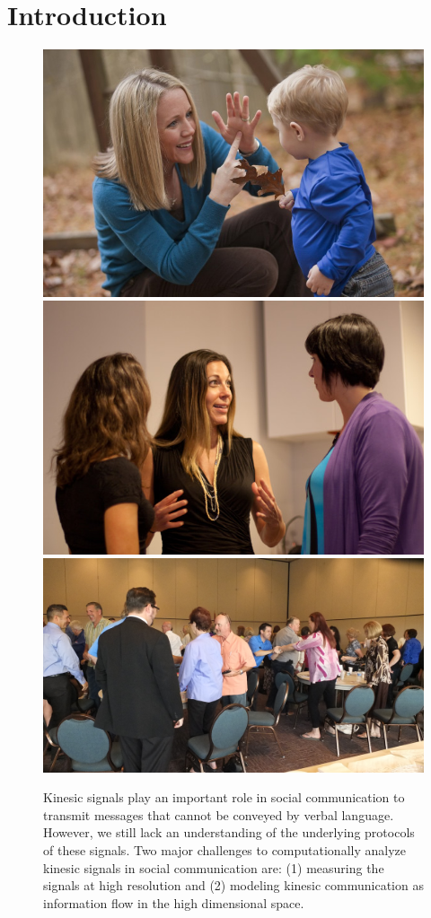 
%
%	

\chapter{Introduction}
\label{sec:introduction}
\begin{figure}[h]
	\centering
	\includegraphics[trim=0 0 0 0, clip=true, height=0.2\columnwidth]{figures/intro_1}
	\includegraphics[trim=0 0 0 0, clip=true, height=0.2\columnwidth]{figures/intro_5}
	\includegraphics[trim=0 0 0 0, clip=true, height=0.2\columnwidth]{figures/intro_3}
	\caption{Kinesic signals play an important role in social communication to transmit messages that cannot be conveyed by verbal language. However, we still lack an understanding of the underlying protocols of these signals. Two major challenges to computationally analyze kinesic signals in social communication are: (1) measuring the signals at high resolution and (2) modeling kinesic communication as information flow in the high dimensional space.}	
	\label{fig:intro}
\end{figure}


